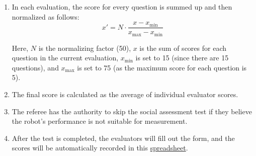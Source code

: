 \begin{enumerate}
    \item In each evaluation, the score for every question is summed up and then normalized as follows:
    \[ x' = N \cdot \frac{{x - x_{\text{min}}}}{{x_{\text{max}} - x_{\text{min}}}} \]

    Here, \( N \) is the normalizing factor (50), \( x \) is the sum of scores for each question in the current evaluation, \( x_{\text{min}} \) is set to 15 (since there are 15 questions), and \( x_{\text{max}} \) is set to 75 (as the maximum score for each question is 5).
    
    \item The final score is calculated as the average of individual evaluator scores.
      
    \item The referee has the authority to skip the social assessment test if they believe the robot's performance is not suitable for measurement.
    
    \item After the test is completed, the evaluators will fill out the form, and the scores will be automatically recorded in this \href{https://urjc-my.sharepoint.com/:x:/g/personal/juan_pena_urjc_es/Eb4WyP1H4-FCqeW-qVZ3mF0BRzBR1Cn-J5ltluy90fhTJQ?rtime=guRqYF483Eg}{spreadsheet}.
\end{enumerate}

